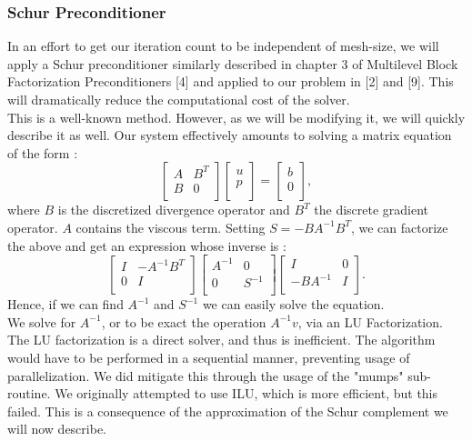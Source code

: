 \documentclass[11pt,twoside,a4paper]{article}
\begin{document}
\subsubsection{Schur Preconditioner}
In an effort to get our iteration count to be independent of mesh-size, we will apply a Schur preconditioner similarly described in chapter 3 of Multilevel Block Factorization Preconditioners [4] and applied to our problem in [2] and [9]. This will dramatically reduce the computational cost of the solver.\\
This is a well-known method. However, as we will be modifying it, we will quickly describe it as well.
Our system effectively amounts to solving a matrix equation of the form :
$$
\begin{bmatrix}
A         & B^{T}\\
B         & 0 \\
\end{bmatrix}
\begin{bmatrix}
u    \\
p     \\
\end{bmatrix}
=
\begin{bmatrix}
b    \\
0     \\
\end{bmatrix} ,
$$
where $B$ is the discretized divergence operator and $B^T$ the discrete gradient operator. $A$ contains the viscous term.
Setting $S = - B A^{-1} B^{T}$, we can factorize the above and get an expression whose inverse is :
$$
\begin{bmatrix}
I         & - A^{-1} B^{T}\\
0         & I \\
\end{bmatrix}
\begin{bmatrix}
A^{-1}   & 0\\
0       & S^{-1} \\
\end{bmatrix}
\begin{bmatrix}
I & 0\\
 - B A^{-1}       & I \\
\end{bmatrix} .
$$
Hence, if we can find $A^{-1}$ and $S^{-1}$ we can easily solve the equation.\\
We solve for $A^{-1}$, or to be exact the operation $A^{-1}v$, via an LU Factorization. The LU factorization is a direct solver, and thus is inefficient. The algorithm would have to be performed in a sequential manner, preventing usage of parallelization. We did mitigate this through the usage of the "mumps" sub-routine. We originally attempted to use ILU, which is more efficient, but this failed. This is a consequence of the approximation of the Schur complement we will now describe.\\
\end{document}
